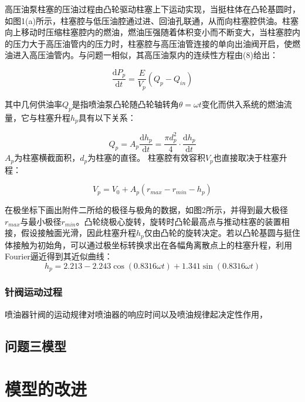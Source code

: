 \documentclass[withoutpreface,bwprint]{cumcmthesis} %
\begin{document}
{{高压油泵柱塞的压油过程由凸轮驱动柱塞上下运动实现，当挺柱体在凸轮基圆时，如图1(a)所示，柱塞腔与低压油腔通过进、回油孔联通，从而向柱塞腔供油。柱塞向上移动时压缩柱塞腔内的燃油，燃油压强随着体积变小而不断变大，当柱塞腔内的压力大于高压油管内的压力时，柱塞腔与高压油管连接的单向出油阀开启，使燃油进入高压油管内。与问题一相似，其高压油泵内的连续性方程由(8)给出：

\begin{equation}\frac{\mathrm{d}P_p}{\mathrm{d}t} = \frac{E}{V_p}(Q_{p} - Q_{in})\end{equation}

其中几何供油率$Q_p$是指喷油泵凸轮随凸轮轴转角$\theta = \omega t$变化而供入系统的燃油流量，它与柱塞升程$h_p$具有以下关系：

\begin{equation}Q_p = A_p \frac{\mathrm{d}h_p}{\mathrm{d}t} = \frac{\pi d_p^2}{4} \cdot \frac{\mathrm{d}h_p}{\mathrm{d}t}\end{equation}
$A_p$为柱塞横截面积，$d_p$为柱塞的直径。
柱塞腔有效容积$V_p$也直接取决于柱塞升程：

\begin{equation}V_p = V_0 + A_p (r_{max} - r_{min} - h_p)\end{equation}

在极坐标下画出附件二所给的极径与极角的数据，如图2所示，并得到最大极径$r_{max}$与最小极径$r_{min}$。凸轮绕极心旋转，旋转时凸轮最高点与推动柱塞的装置相接，假设接触面光滑，因此柱塞升程$h_p$仅由凸轮的旋转决定。若以凸轮基圆与挺住体接触为初始角，可以通过极坐标转换求出在各幅角离散点上的柱塞升程，利用Fourier逼近得到其近似曲线：
\begin{equation}h_p = 2.213 - 2.243 \cos(0.8316 \omega t) + 1.341 \sin(0.8316 \omega t)\end{equation}



\subsubsection{针阀运动过程}

喷油器针阀的运动规律对喷油器的响应时间以及喷油规律起决定性作用，
\subsection{问题三模型}


\section{模型的改进}


}}
\end{document}
